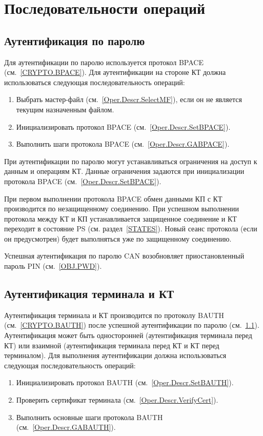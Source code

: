 \section{Последовательности операций}
\label{Oper.Seq}

\subsection{Аутентификация по паролю}
\label{Oper.Seq.BPACE}

Для аутентификации по паролю используется протокол BPACE 
(см.~\ref{CRYPTO.BPACE}). Для аутентификации на стороне КТ должна 
использоваться следующая последовательность операций:

\begin{enumerate}
\item Выбрать мастер-файл (см.~\ref{Oper.Descr.SelectMF}), 
если он не является текущим назначенным файлом.

\item Инициализировать протокол BPACE (см.~\ref{Oper.Descr.SetBPACE}).

\item Выполнить шаги протокола BPACE (см.~\ref{Oper.Descr.GABPACE}).
\end{enumerate}

При аутентификации по паролю могут устанавливаться ограничения 
на доступ к данным и операциям КТ.
Данные ограничения задаются при инициализации 
протокола BPACE (см.~\ref{Oper.Descr.SetBPACE}).

При первом выполнении протокола BPACE обмен данными КП с КТ производится 
по незащищенному соединению. При успешном выполнении протокола между КТ и 
КП устанавливается защищенное соединение и КТ переходит в состояние PS
(см. раздел~\ref{STATES}). Новый сеанс протокола (если он 
предусмотрен) будет выполняться уже по защищенному соединению. 

Успешная аутентификация по паролю CAN возобновляет приостановленный 
пароль PIN (см.~\ref{OBJ.PWD}).

\subsection{Аутентификация терминала и КТ}
\label{Oper.Seq.BAUTH}

Аутентификация терминала и КТ производится по протоколу BAUTH 
(см.~\ref{CRYPTO.BAUTH}) после успешной аутентификации по паролю 
(см.~\ref{Oper.Seq.BPACE}). Аутентификация может быть односторонней 
(аутентификация терминала перед КТ) или взаимной (аутентификация терминала 
перед КТ и КТ перед терминалом). Для выполнения аутентификации должна 
использоваться следующая последовательность операций:
%
\begin{enumerate}
\item Инициализировать протокол BAUTH (см.~\ref{Oper.Descr.SetBAUTH}).
\item Проверить сертификат терминала (см.~\ref{Oper.Descr.VerifyCert}).
\item Выполнить основные шаги протокола BAUTH (см.~\ref{Oper.Descr.GABAUTH}).
\end{enumerate}

